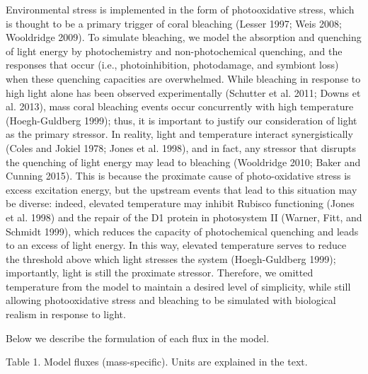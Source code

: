 \documentclass[]{elsarticle} %
\begin{document}
Environmental stress is implemented in the form of photooxidative
stress, which is thought to be a primary trigger of coral bleaching
(Lesser 1997; Weis 2008; Wooldridge 2009). To simulate bleaching, we
model the absorption and quenching of light energy by photochemistry and
non-photochemical quenching, and the responses that occur (i.e.,
photoinhibition, photodamage, and symbiont loss) when these quenching
capacities are overwhelmed. While bleaching in response to high light
alone has been observed experimentally (Schutter et al. 2011; Downs et
al. 2013), mass coral bleaching events occur concurrently with high
temperature (Hoegh-Guldberg 1999); thus, it is important to justify our
consideration of light as the primary stressor. In reality, light and
temperature interact synergistically (Coles and Jokiel 1978; Jones et
al. 1998), and in fact, any stressor that disrupts the quenching of
light energy may lead to bleaching (Wooldridge 2010; Baker and Cunning
2015). This is because the proximate cause of photo-oxidative stress is
excess excitation energy, but the upstream events that lead to this
situation may be diverse: indeed, elevated temperature may inhibit
Rubisco functioning (Jones et al. 1998) and the repair of the D1 protein
in photosystem II (Warner, Fitt, and Schmidt 1999), which reduces the
capacity of photochemical quenching and leads to an excess of light
energy. In this way, elevated temperature serves to reduce the threshold
above which light stresses the system (Hoegh-Guldberg 1999);
importantly, light is still the proximate stressor. Therefore, we
omitted temperature from the model to maintain a desired level of
simplicity, while still allowing photooxidative stress and bleaching to
be simulated with biological realism in response to light.

Below we describe the formulation of each flux in the model.

Table 1. Model fluxes (mass-specific). Units are explained in the text.
\end{document}

